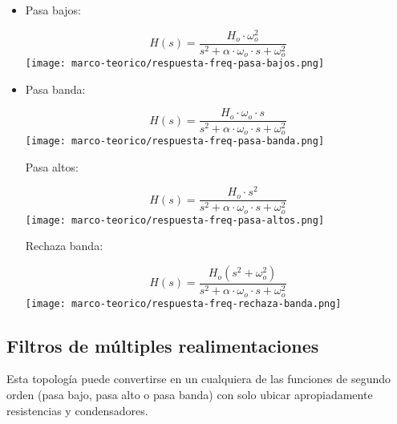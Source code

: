 \begin{itemize}
\item 
Pasa bajos:
\begin{multicols}{2}
\begin{equation}
    H(s) = \frac{H_o \cdot \omega_o^2}{s^2 + \alpha \cdot \omega_o \cdot s + \omega_o^2}
    \label{eq:func-transferencia-pasa-bajos}
\end{equation}
\texttt{[image: marco-teorico/respuesta-freq-pasa-bajos.png]}
\end{multicols}
    \item 
    Pasa banda:
    \begin{multicols}{2}
    \begin{equation}
        H(s) = \frac{H_o \cdot \omega_o \cdot s}{s^2 + \alpha \cdot \omega_o \cdot s + \omega_o^2}
        \label{eq:func-transferencia-pasa-banda}
    \end{equation}
    \texttt{[image: marco-teorico/respuesta-freq-pasa-banda.png]}
    \end{multicols}
Pasa altos:
\begin{multicols}{2}
\begin{equation}
    H(s) = \frac{H_o \cdot s^2}{s^2 + \alpha \cdot \omega_o \cdot s + \omega_o^2}
    \label{eq:func-transferencia-pasa-altos}
\end{equation}
    \texttt{[image: marco-teorico/respuesta-freq-pasa-altos.png]}
\end{multicols}
Rechaza banda:
\begin{multicols}{2}
\begin{equation}
    H(s) = \frac{H_o \left( s^2 + \omega_o^2 \right)}{s^2 + \alpha \cdot \omega_o \cdot s + \omega_o^2}
    \label{eq:func-transferencia-rechaza-banda}
\end{equation}
    \texttt{[image: marco-teorico/respuesta-freq-rechaza-banda.png]}
\end{multicols}
\end{itemize}

\subsection{Filtros de múltiples realimentaciones}

Esta topología puede convertirse en un cualquiera de las funciones de segundo orden (pasa bajo, pasa alto o pasa banda) con solo ubicar apropiadamente resistencias y condensadores.

